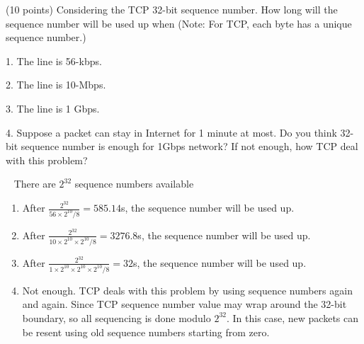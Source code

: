 \begin{exercise}[]{(10 points) Considering the TCP 32-bit sequence number. How long will the sequence number will be used up when (Note: For TCP, each byte has a unique sequence number.)

    1. The line is 56-kbps.

    2. The line is 10-Mbps.

    3. The line is 1 Gbps.

    4. Suppose a packet can stay in Internet for 1 minute at most. Do you think 32-bit sequence number is enough for 1Gbps network? If not enough, how TCP deal with this problem?
    }
  \begin{solution}
  \par{~}
  There are $2^32$ sequence numbers available
  \begin{enumerate}
      \item After $\frac{2^32}{56\times 2^10 / 8} = 585.14$s, the sequence number will be used up.
      \item After $\frac{2^32}{10\times 2^10 \times 2^10 / 8} = 3276.8$s, the sequence number will be used up.
      \item After $\frac{2^32}{1\times 2^10\times 2^10 \times 2^10 / 8} = 32$s, the sequence number will be used up.
      \item Not enough. TCP deals with this problem by using sequence numbers again and again. Since TCP sequence number value may wrap around the 32-bit boundary, so all sequencing is done modulo $2^{32}$. In this case, new packets can be resent using old sequence numbers starting from zero. 
  \end{enumerate}
  \end{solution}
  \label{ex4}
\end{exercise}


